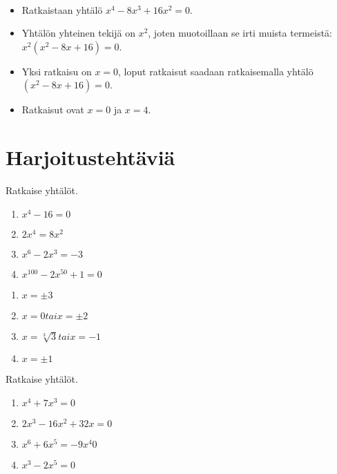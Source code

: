 \begin{esimerkki}{\ }
\begin{itemize}
    \item Ratkaistaan yhtälö $x^4-8x^3+16x^2=0$.
    \item Yhtälön yhteinen tekijä on $x^2$, joten muotoillaan se irti muista termeistä: $x^2(x^2-8x+16)=0$.
    \item Yksi ratkaisu on $x=0$, loput ratkaisut saadaan ratkaisemalla yhtälö $(x^2-8x+16)=0$.
    \item Ratkaisut ovat $x=0$ ja $x=4$.

\end{itemize}
\end{esimerkki}

\section{Harjoitustehtäviä}

\begin{tehtava}
    Ratkaise yhtälöt.
    \begin{enumerate}
        \item $x^4 - 16 = 0$
        \item $2x^4 = 8x^2$
        \item $x^6 - 2x^3 = -3$
        \item $x^{100} - 2x^{50} + 1 = 0$
    \end{enumerate}
    \begin{vastaus}
        \begin{enumerate}
            \item $x = \pm3$
            \item $x= 0 tai x=\pm2$
            \item $x = \sqrt[3]{3} tai x= -1$
            \item $x = \pm1$
        \end{enumerate}
    \end{vastaus}
\end{tehtava}

\begin{tehtava}
    Ratkaise yhtälöt.
    \begin{enumerate}
        \item $x^4 + 7x^3 = 0$
        \item $2x^3 - 16x^2 + 32x = 0$
        \item $x^6 + 6x^5 = -9x^4 0$
        \item $x^3 - 2x^5 = 0$      
    \end{enumerate}
    \begin{vastaus}
        \begin{enumerate}
        	\item $x = 0$ tai $x = -7$
        	\item $x = 0$ tai $x = 4$
        	\item $x = 0$ tai $x = 3$
            \item $x = 0$ tai $x = \pm\dfrac{1}{\sqrt{2}}}$
        \end{enumerate}
    \end{vastaus}
\end{tehtava}

